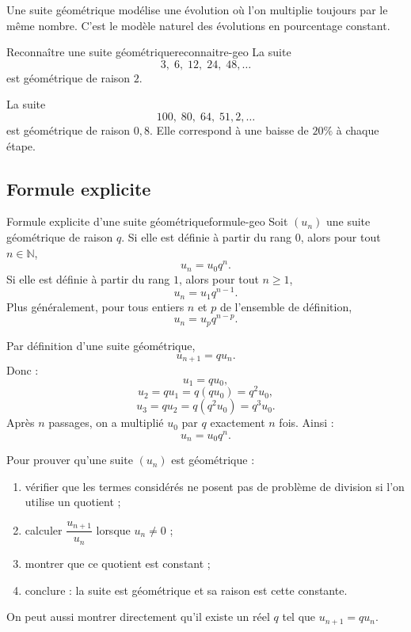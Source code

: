 \documentclass[11pt,a4paper]{article}
\newcommand{\N}{\mathbb{N}}
\begin{document}
\begin{rememberbox}
Une suite géométrique modélise une évolution où l'on multiplie toujours par le même nombre.
C'est le modèle naturel des évolutions en pourcentage constant.
\end{rememberbox}

\begin{examplebox}{Reconnaître une suite géométrique}{reconnaitre-geo}
La suite
\[
3,\;6,\;12,\;24,\;48,\ldots
\]
est géométrique de raison $2$.

La suite
\[
100,\;80,\;64,\;51{,}2,\ldots
\]
est géométrique de raison $0{,}8$.
Elle correspond à une baisse de $20\%$ à chaque étape.
\end{examplebox}

\subsection{Formule explicite}

\begin{theorembox}{Formule explicite d'une suite géométrique}{formule-geo}
Soit $(u_n)$ une suite géométrique de raison $q$.
Si elle est définie à partir du rang $0$, alors pour tout $n\in\N$,
\[
 u_n=u_0 q^n.
\]
Si elle est définie à partir du rang $1$, alors pour tout $n\geq1$,
\[
 u_n=u_1 q^{n-1}.
\]
Plus généralement, pour tous entiers $n$ et $p$ de l'ensemble de définition,
\[
 u_n=u_p q^{n-p}.
\]
\end{theorembox}

\begin{proofbox}
Par définition d'une suite géométrique,
\[
 u_{n+1}=q u_n.
\]
Donc :
\[
 u_1=q u_0,
\]
\[
 u_2=q u_1=q(q u_0)=q^2u_0,
\]
\[
 u_3=q u_2=q(q^2u_0)=q^3u_0.
\]
Après $n$ passages, on a multiplié $u_0$ par $q$ exactement $n$ fois. Ainsi :
\[
 u_n=u_0q^n.
\]
\end{proofbox}

\begin{methodbox}
Pour prouver qu'une suite $(u_n)$ est géométrique :
\begin{enumerate}
  \item vérifier que les termes considérés ne posent pas de problème de division si l'on utilise un quotient ;
  \item calculer $\dfrac{u_{n+1}}{u_n}$ lorsque $u_n\neq0$ ;
  \item montrer que ce quotient est constant ;
  \item conclure : la suite est géométrique et sa raison est cette constante.
\end{enumerate}
On peut aussi montrer directement qu'il existe un réel $q$ tel que $u_{n+1}=q u_n$.
\end{methodbox}
\end{document}
